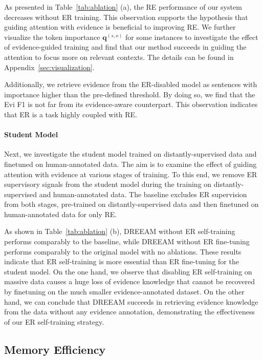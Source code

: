 \documentclass[11pt]{article}
\begin{document}
As presented in Table~\ref{tab:ablation} (a), the RE performance of our system decreases without ER training.
This observation supports the hypothesis that guiding attention with evidence is beneficial to improving RE.
We further visualize the token importance $\bm{q}^{(s,o)}$ for some instances to investigate the effect of evidence-guided training and find that our method succeeds in guiding the attention to focus more on relevant contexts.
The details can be found in Appendix~\ref{sec:visualization}.

Additionally, we retrieve evidence from the ER-disabled model as sentences with importance higher than the pre-defined threshold.
By doing so, we find that the Evi F1 is not far from its evidence-aware counterpart.
This observation indicates that ER is a task highly coupled with RE.

\paragraph{Student Model} Next, we investigate the student model trained on distantly-supervised data and finetuned on human-annotated data.
The aim is to examine the effect of guiding attention with evidence at various stages of training.
To this end, we remove ER supervisory signals from the student model during the training on distantly-supervised and human-annotated data.
The baseline excludes ER supervision from both stages, pre-trained on distantly-supervised data and then finetuned on human-annotated data for only RE.

As shown in Table~\ref{tab:ablation} (b), DREEAM without ER self-training performs comparably to the baseline, while DREEAM without ER fine-tuning performs comparably to the original model with no ablations.
These results indicate that ER self-training is more essential than ER fine-tuning for the student model.
On the one hand, we observe that disabling ER self-training on massive data causes a huge loss of evidence knowledge that cannot be recovered by finetuning on the much smaller evidence-annotated dataset.
On the other hand, we can conclude that DREEAM succeeds in retrieving evidence knowledge from the data without any evidence annotation, demonstrating the effectiveness of our ER self-training strategy.




\subsection{Memory Efficiency}
\end{document}
